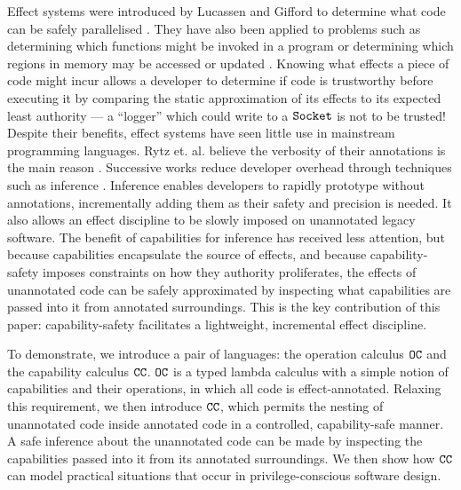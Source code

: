 Effect systems were introduced by Lucassen and Gifford to determine what code can be safely parallelised \cite{lucassen88}. They have also been applied to problems such as determining which functions might be invoked in a program \cite{tang94} or determining which regions in memory may be accessed or updated \cite{talpin94}. Knowing what effects a piece of code might incur allows a developer to determine if code is trustworthy before executing it by comparing the static approximation of its effects to its expected least authority --- a ``logger'' which could write to a $\mathtt{Socket}$ is not to be trusted! Despite their benefits, effect systems have seen little use in mainstream programming languages. Rytz et. al. believe the verbosity of their annotations is the main reason \citep{rytz12}. Successive works reduce developer overhead through techniques such as inference \cite{CITATION_NEEDED}. Inference enables developers to rapidly prototype without annotations, incrementally adding them as their safety and precision is needed. It also allows an effect discipline to be slowly imposed on unannotated legacy software. The benefit of capabilities for inference has received less attention, but because capabilities encapsulate the source of effects, and because capability-safety imposes constraints on how they authority proliferates, the effects of unannotated code can be safely approximated by inspecting what capabilities are passed into it from annotated surroundings. This is the key contribution of this paper: capability-safety facilitates a lightweight, incremental effect discipline.

To demonstrate, we introduce a pair of languages: the operation calculus $\mathtt{OC}$ and the capability calculus $\mathtt{CC}$. $\mathtt{OC}$ is a typed lambda calculus with a simple notion of capabilities and their operations, in which all code is effect-annotated. Relaxing this requirement, we then introduce $\mathtt{CC}$, which permits the nesting of unannotated code inside annotated code in a controlled, capability-safe manner. A safe inference about the unannotated code can be made by inspecting the capabilities passed into it from its annotated surroundings. We then show how $\mathtt{CC}$ can model practical situations that occur in privilege-conscious software design.



